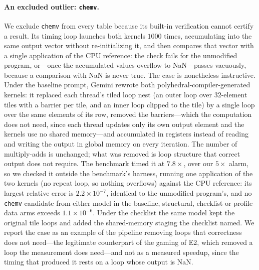\paragraph{An excluded outlier: \texttt{chemv}.}
We exclude \texttt{chemv} from every table because its built-in verification cannot certify a result.
Its timing loop launches both kernels $1000$ times, accumulating into the same output vector without
re-initializing it, and then compares that vector with a single application of the CPU reference: the
check fails for the unmodified program, or---once the accumulated values overflow to NaN---passes
vacuously, because a comparison with NaN is never true. The case is nonetheless instructive. Under the
baseline prompt, Gemini rewrote both polyhedral-compiler-generated kernels: it replaced each thread's
tiled loop nest (an outer loop over $32$-element tiles with a barrier per tile, and an inner loop
clipped to the tile) by a single loop over the same elements of its row, removed the barriers---which
the computation does not need, since each thread updates only its own output element and the kernels
use no shared memory---and accumulated in registers instead of reading and writing the output in global
memory on every iteration. The number of multiply-adds is unchanged; what was removed is loop structure
that correct output does not require. The benchmark timed it at $7.8\times$, over our $5\times$ alarm,
so we checked it outside the benchmark's harness, running one application of the two kernels (no
repeat loop, so nothing overflows) against the CPU reference: its largest relative error is
$2.2\times10^{-7}$, identical to the unmodified program's, and no \texttt{chemv} candidate from either
model in the baseline, structural, checklist or profile-data arms exceeds $1.1\times10^{-6}$. Under the
checklist the same model kept the original tile loops and added the shared-memory staging the checklist
named. We report the case as an example of the pipeline removing loops that correctness does not
need---the legitimate counterpart of the gaming of E2, which removed a loop the measurement does
need---and not as a measured speedup, since the timing that produced it rests on a loop whose output is
NaN.
